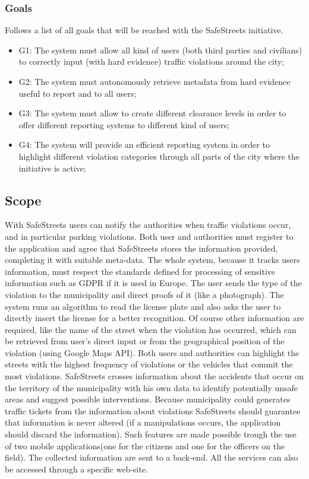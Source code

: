 \documentclass{article}
\begin{document}
    \subsubsection{Goals} Follows a list of all goals that will be reached with the SafeStreets initiative.
    \begin{itemize}
        \item G1: The system must allow all kind of users (both third parties and civilians) to correctly input (with hard evidence) traffic violations around the city;
        \item G2: The system must autonomously retrieve metadata from hard evidence useful to report and to all users;
        \item G3: The system must allow to create different clearance levels in order to offer different reporting systems to different kind of users;
        \item G4: The system will provide an efficient reporting system in order to highlight different violation categories through all parts of the city where the initiative is active;
    \end{itemize}
\subsection{Scope}
With SafeStreets users can notify the authorities when traffic violations occur, and in particular parking violations.
Both user and authorities must register to the application and agree that SafeStreets stores the information provided, completing it with suitable meta-data.
The whole system, because it tracks users information, must respect the standards defined for processing of sensitive information such as GDPR if it is used in Europe.
The user sends the type of the violation to the municipality and direct proofs of it (like a photograph). The system runs an algorithm to read the license plate and also asks the user to directly insert the license for a better recognition.
Of course other information are required, like the name of the street when the violation has occurred, which can be retrieved from user's direct input or from the geographical position of the violation (using Google Maps API).  
Both users and authorities can highlight the streets with the highest frequency of violations or the vehicles that commit the most violations.
SafeStreets crosses information about the accidents that occur on the territory of the municipality with his own data to identify potentially unsafe areas and suggest possible interventions.
Because municipality could generates traffic tickets from the information about violations SafeStreets should guarantee that information is never altered (if a manipulations occurs, the application should discard the information).
Such features are made possible trough the use of two mobile applications(one for the citizens and one for the officers on the field).
The collected information are sent to a back-end.
All the services can also be accessed through a specific web-site. 
\end{document}
